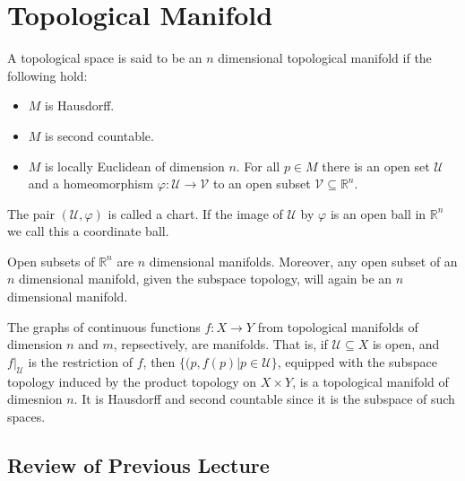 \documentclass{article}                                                        %
\begin{document}
    \section{Topological Manifold}
        \begin{definition}
            A topological space is said to be an $n$ dimensional topological
            manifold if the following hold:
            \begin{itemize}
                \item $M$ is Hausdorff.
                \item $M$ is second countable.
                \item $M$ is locally Euclidean of dimension $n$. For all
                      $p\in{M}$ there is an open set $\mathcal{U}$ and a
                      homeomorphism $\varphi:\mathcal{U}\rightarrow\mathcal{V}$
                      to an open subset $\mathcal{V}\subseteq\mathbb{R}^{n}$.
            \end{itemize}
            The pair $(\mathcal{U},\varphi)$ is called a chart. If the image of
            $\mathcal{U}$ by $\varphi$ is an open ball in $\mathbb{R}^{n}$ we
            call this a coordinate ball.
        \end{definition}
        \begin{example}
            Open subsets of $\mathbb{R}^{n}$ are $n$ dimensional manifolds.
            Moreover, any open subset of an $n$ dimensional manifold, given the
            subspace topology, will again be an $n$ dimensional manifold.
        \end{example}
        \begin{example}
            The graphs of continuous functions $f:X\rightarrow{Y}$ from
            topological manifolds of dimension $n$ and $m$, repsectively, are
            manifolds. That is, if $\mathcal{U}\subseteq{X}$ is open, and
            $f|_{\mathcal{U}}$ is the restriction of $f$, then
            $\{(p,f(p)|p\in\mathcal{U}\}$, equipped with the subspace topology
            induced by the product topology on $X\times{Y}$, is a topological
            manifold of dimesnion $n$. It is Hausdorff and second countable
            since it is the subspace of such spaces.
        \end{example}
        \subsection{Review of Previous Lecture}
\end{document}
